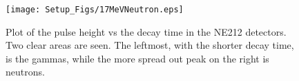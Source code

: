 \begin{figure}
    \centering
    \texttt{[image: Setup\_Figs/17MeVNeutron.eps]}
    \caption{Plot of the pulse height vs the decay time in the NE212 detectors. Two clear areas are seen. The leftmost, with the shorter decay time, is the gammas, while the more spread out peak on the right is neutrons.}
    \label{fig:neutron}
\end{figure}